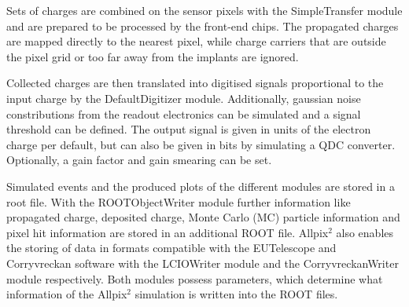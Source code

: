 Sets of charges are combined on the sensor pixels with the SimpleTransfer module and are prepared  to be processed by the front-end chips. The
propagated charges are mapped directly to the nearest pixel, while charge carriers that are outside the pixel grid or too far away from the implants are ignored.

Collected charges are then translated into digitised signals proportional to the input charge by the DefaultDigitizer module. Additionally, gaussian noise constributions
from the readout electronics can be simulated and a signal threshold can be defined. The output signal is given in units of the electron charge per default, but
can also be given in bits by simulating a QDC converter. Optionally, a gain factor and gain smearing can be set.

Simulated events and the produced plots of the different modules are stored in a root file. With the ROOTObjectWriter module further information like propagated charge,
deposited charge, Monte Carlo (MC) particle information and pixel hit information are stored in an additional ROOT file. Allpix$^2$ also enables the storing of
data in formats compatible with the EUTelescope and Corryvreckan software with the LCIOWriter module and the CorryvreckanWriter module respectively. Both modules possess parameters, which
determine what information of the Allpix$^2$ simulation is written into the ROOT files.
